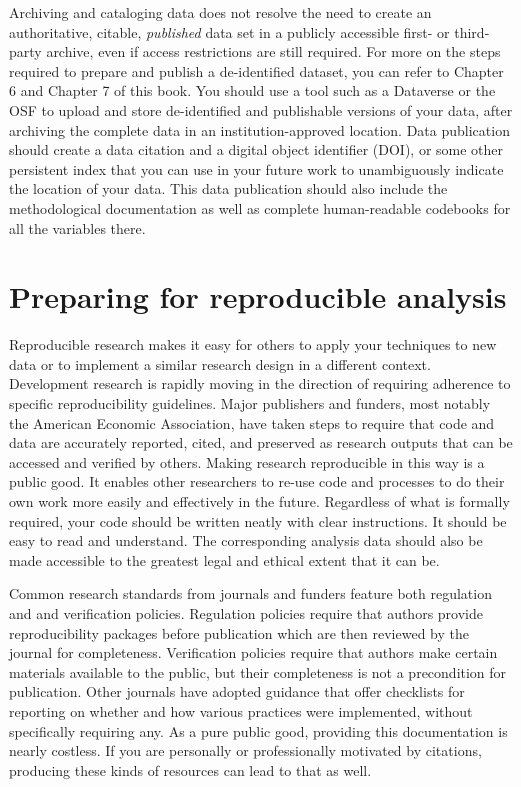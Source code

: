 Archiving and cataloging data does not resolve
the need to create an authoritative, citable, \textit{published} data set
in a publicly accessible first- or third-party archive,
even if access restrictions are still required.
For more on the steps required to prepare and publish a de-identified dataset,
you can refer to Chapter 6 and Chapter 7 of this book.
You should use a tool such as a Dataverse or the OSF
to upload and store de-identified and publishable versions of your data,
after archiving the complete data in an institution-approved location.
Data publication should create a data citation and a digital object identifier (DOI),
or some other persistent index that you can use in your future work
to unambiguously indicate the location of your data.
This data publication should also include the methodological documentation
as well as complete human-readable codebooks for all the variables there.

\section{Preparing for reproducible analysis}

Reproducible research makes it easy
for others to apply your techniques to new data
or to implement a similar research design in a different context.
Development research is rapidly moving in the direction of requiring adherence
to specific reproducibility guidelines.\cite{christensen2018transparency}
Major publishers and funders, most notably the American Economic Association,
have taken steps to require that code and data
are accurately reported, cited, and preserved as research outputs
that can be accessed and verified by others.\cite{vilhuber2020report}
Making research reproducible in this way is a public good.
It enables other researchers to re-use code and processes
to do their own work more easily and effectively in the future.
Regardless of what is formally required,
your code should be written neatly with clear instructions.
It should be easy to read and understand.
The corresponding analysis data should also be made accessible
to the greatest legal and ethical extent that it can be.

Common research standards from journals and funders feature both
regulation and and verification policies.\cite{stodden2013toward}
Regulation policies require that authors
provide reproducibility packages before publication
which are then reviewed by the journal for completeness.
Verification policies require that authors
make certain materials available to the public,
but their completeness is not a precondition for publication.
Other journals have adopted guidance that offer checklists
for reporting on whether and how various practices were implemented,
without specifically requiring any.\cite{nosek2015promoting}
As a pure public good, providing this documentation is nearly costless.
If you are personally or professionally motivated by citations,
producing these kinds of resources can lead to that as well.

